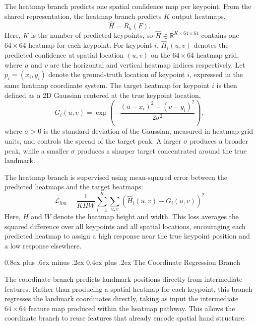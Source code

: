 \documentclass[10pt,letterpaper]{article}
\makeatletter
\renewcommand\subsubsection{\@startsection{subsubsection}{3}{\z@}%
  {0.8ex plus .6ex minus .2ex}%
  {0.4ex plus .2ex}%
  {\normalfont\small\itshape}}
\makeatother
\begin{document}
\noindent
The heatmap branch predicts one spatial confidence map per keypoint. From the shared representation, the heatmap branch predicts \(K\) output heatmaps,
\begin{equation}
\hat{H} = R_h(F).
\label{eq:heatmap-output}
\end{equation}
Here, \(K\) is the number of predicted keypoints, so \(\hat{H} \in \mathbb{R}^{K \times 64 \times 64}\) contains one \(64 \times 64\) heatmap for each keypoint. For keypoint \(i\), \(\hat{H}_i(u,v)\) denotes the predicted confidence at spatial location \((u,v)\) on the \(64 \times 64\) heatmap grid, where \(u\) and \(v\) are the horizontal and vertical heatmap indices respectively. Let \(p_i = (x_i, y_i)\) denote the ground-truth location of keypoint \(i\), expressed in the same heatmap coordinate system. The target heatmap for keypoint \(i\) is then defined as a 2D Gaussian centered at the true keypoint location,
\begin{equation}
G_i(u,v) = \exp\left(
-\frac{(u-x_i)^2 + (v-y_i)^2}{2\sigma^2}
\right),
\label{eq:gaussian-target}
\end{equation}
where \(\sigma > 0\) is the standard deviation of the Gaussian, measured in heatmap-grid units, and controls the spread of the target peak. A larger \(\sigma\) produces a broader peak, while a smaller \(\sigma\) produces a sharper target concentrated around the true landmark.

The heatmap branch is supervised using mean-squared error between the predicted heatmaps and the target heatmaps:
\begin{equation}
\mathcal{L}_{hm}
=
\frac{1}{KHW}
\sum_{i=1}^{K}
\sum_{u,v}
\left(\hat{H}_i(u,v) - G_i(u,v)\right)^2
\label{eq:heatmap-loss}
\end{equation}
Here, \(H\) and \(W\) denote the heatmap height and width. This loss averages the squared difference over all keypoints and all spatial locations, encouraging each predicted heatmap to assign a high response near the true keypoint position and a low response elsewhere. 

\subsubsection{The Coordinate Regression Branch}

\noindent
The coordinate branch predicts landmark positions directly from intermediate features. Rather than producing a spatial heatmap for each keypoint, this branch regresses the landmark coordinates directly, taking as input the intermediate \(64 \times 64\) feature map produced within the heatmap pathway. This allows the coordinate branch to reuse features that already encode spatial hand structure.
\end{document}
